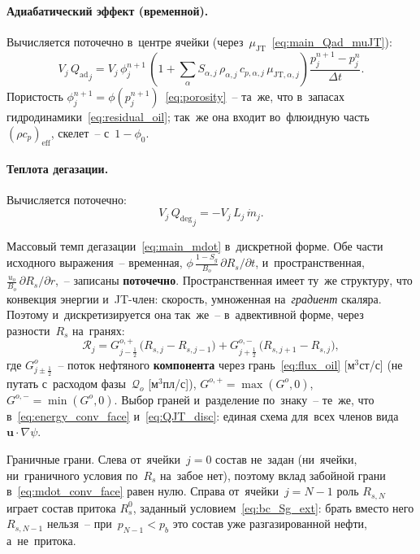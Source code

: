 \documentclass[12pt,a4paper]{article}
\newcommand{\half}{\tfrac{1}{2}}
\newcommand{\mdot}{\dot{m}}
\newcommand{\rhocpeff}{(\rho c_p)_{\mathrm{eff}}}
\newcommand{\Qad}{Q_{\mathrm{ad}}}
\newcommand{\Qdeg}{Q_{\mathrm{deg}}}
\begin{document}
\paragraph{Адиабатический эффект (временной).}
Вычисляется поточечно в~центре ячейки
(через~$\mu_{\mathrm{JT}}$~\eqref{eq:main_Qad_muJT}):
\begin{equation}\label{eq:Qad_disc}
  V_j\,{\Qad}_j = V_j\,\phi_j^{n+1}\,
    \left(1 + \sum_\alpha S_{\alpha,j}\,
    \rho_{\alpha,j}\,c_{p,\alpha,j}\,
    \mu_{\mathrm{JT},\alpha,j}\right)
    \frac{p_j^{n+1}-p_j^n}{\Delta t}.
\end{equation}
Пористость $\phi_j^{n+1} = \phi(p_j^{n+1})$~\eqref{eq:porosity}~-- та~же,
что в~запасах гидродинамики~\eqref{eq:residual_oil}; так~же она входит
во~флюидную часть~$\rhocpeff$, скелет~-- с~$1 - \phi_0$.

\paragraph{Теплота дегазации.}
Вычисляется поточечно:
\begin{equation}\label{eq:Qdeg_disc}
  V_j\,{\Qdeg}_j = -V_j\,L_j\,\mdot_j.
\end{equation}

Массовый темп дегазации~\eqref{eq:main_mdot} в~дискретной форме.
Обе части исходного выражения~-- временная,
$\phi\,\frac{1-S_g}{B_o}\,\partial R_s/\partial t$, и~пространственная,
$\frac{u_o}{B_o}\,\partial R_s/\partial r$,~-- записаны
\textbf{поточечно}. Пространственная имеет ту~же структуру, что
конвекция энергии и~JT-член: скорость, умноженная
на~\emph{градиент} скаляра. Поэтому и~дискретизируется она так~же~--
в~адвективной форме, через разности~$R_s$ на~гранях:
\begin{equation}\label{eq:mdot_conv_face}
  \boxed{
    \mathcal{R}_j
    = G^{o,+}_{j-\half}\,\bigl(R_{s,j} - R_{s,j-1}\bigr)
    + G^{o,-}_{j+\half}\,\bigl(R_{s,j+1} - R_{s,j}\bigr),
  }
\end{equation}
где $G^o_{j\pm\half}$~-- поток нефтяного
\textbf{компонента} через грань~\eqref{eq:flux_oil}
[м$^3$ст/с] (не путать с~расходом фазы~$\mathcal{Q}_o$
[м$^3$пл/с]), $G^{o,+} = \max(G^o,0)$, $G^{o,-} = \min(G^o,0)$.
Выбор граней и~разделение по~знаку~-- те~же, что
в~\eqref{eq:energy_conv_face} и~\eqref{eq:QJT_disc}: единая схема
для~всех членов вида $\mathbf{u}\cdot\nabla\psi$.

Граничные грани. Слева от~ячейки~$j = 0$ состав не~задан
(ни~ячейки, ни~граничного условия по~$R_s$ на~забое нет), поэтому
вклад забойной грани в~\eqref{eq:mdot_conv_face} равен нулю.
Справа от~ячейки~$j = N{-}1$ роль $R_{s,N}$ играет состав притока
$R_s^0$, заданный условием~\eqref{eq:bc_Sg_ext}: брать вместо него
$R_{s,N-1}$ нельзя~-- при~$p_{N-1} < p_b$ это состав уже
разгазированной нефти, а~не~притока.
\end{document}
